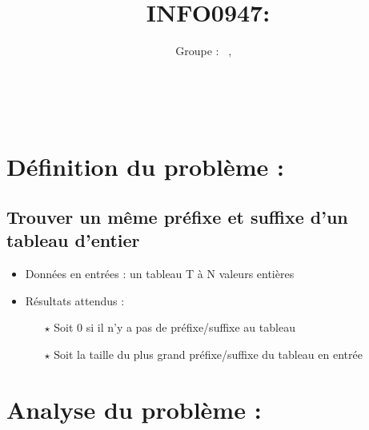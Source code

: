 \documentclass[a4paper, 11pt, oneside]{article}
\title{INFO0947: \intitule}
\author{Groupe \GrNbr : \PrenomUN~\textsc{\NomUN}, \PrenomDEUX~\textsc{\NomDEUX}}
\date{}
\newcommand{\tablemat}{~}
\begin{document}
\maketitle
\newpage
\tablemat
\newpage


\section{\LARGE \bfseries Définition du problème : }
	\subsection{Trouver un même préfixe et suffixe d'un tableau d'entier}
		\begin{itemize}
			\item Données en entrées : un tableau T à N valeurs entières
			\item Résultats attendus : 
			\begin{itemize}
				\item[$\star$] Soit 0 si il n'y a pas de préfixe/suffixe au tableau
				\item[$\star$] Soit la taille du plus grand préfixe/suffixe du tableau en entrée
			\end{itemize}
		\end{itemize}
		
\section{\LARGE \bfseries Analyse du problème : }
\end{document}
